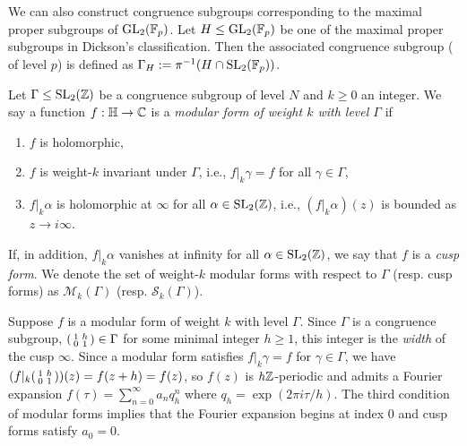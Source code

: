 \begin{example}
We can also construct congruence subgroups corresponding to the maximal proper subgroups of $\operatorname{GL}_2(\mathbb{F}_p)$. Let $H \leq \operatorname{GL}_2(\mathbb{F}_p)$ be one of the maximal proper subgroups in Dickson's classification. Then the associated congruence subgroup ( of level $p$) is defined as $\Gamma_H := \pi^{-1}(H \cap \operatorname{SL}_2(\mathbb{F}_p))$.
\end{example}

\begin{defn}
    Let $\Gamma \leq \operatorname{SL}_2(\mathbb{Z})$ be a congruence subgroup of level $N$ and $k \geq 0$ an integer. We say a function $f: \mathbb{H} \rightarrow \mathbb{C}$ is a \textit{modular form of weight $k$ with level $\Gamma$} if

    \begin{enumerate}
        \item $f$ is holomorphic,
        \item $f$ is weight-$k$ invariant under $\Gamma$, i.e., $f|_k\gamma = f$ for all $\gamma \in \Gamma$,
        \item $f|_k\alpha $ is holomorphic at $\infty$ for all $\alpha \in \operatorname{SL}_2(\mathbb{Z})$, i.e., $(f|_k \alpha )(z)$ is bounded as $z \rightarrow i\infty$.
    \end{enumerate}

    If, in addition, $f|_k \alpha$ vanishes at infinity for all $\alpha \in \operatorname{SL}_2(\mathbb{Z})$, we say that $f$ is a \textit{cusp form}. We denote the set of weight-$k$ modular forms with respect to $\Gamma$ (resp. cusp forms) as $\mathcal{M}_k(\Gamma)$ (resp. $\mathcal{S}_k(\Gamma)$).
\end{defn}

Suppose $f$ is a modular form of weight $k$ with level $\Gamma$. Since $\Gamma$ is a congruence subgroup, $\begin{psmallmatrix}
    1 & h \\ 0 & 1
\end{psmallmatrix} \in \Gamma$ for some minimal integer $h\geq 1$, this integer is the \textit{width} of the cusp $\infty$. Since a modular form satisfies $f|_k \gamma = f$ for $\gamma \in \Gamma$, we have $(f|_k \begin{psmallmatrix}
    1 & h \\ 0 & 1
\end{psmallmatrix})(z) = f(z+h) = f(z) $, so $f(z)$ is $h\mathbb{Z}$-periodic and admits a Fourier expansion $f(\tau) = \sum_{n=0}^\infty a_n q_{h}^n$ where $q_h = \exp(2\pi i\tau / h)$. The third condition of modular forms implies that the Fourier expansion begins at index $0$ and cusp forms satisfy $a_0 = 0$.

